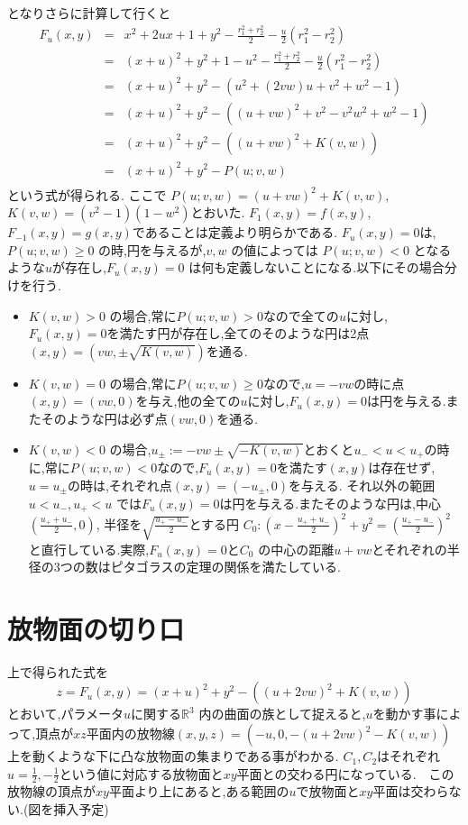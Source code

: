 \documentclass[a4j,12pt]{jarticle}
\numberwithin{equation}{section}
\newcommand{\R}{\mathbb R}
\begin{document}
となりさらに計算して行くと
\begin{eqnarray}
     F_u(x,y) &=& x^2 + 2u x + 1 + y^2  - \frac{r_1^2  +r_2^2}{2} -\frac{u}{2}(r_1^2  -r_2^2) \nonumber\\
      &=&  (x + u )^2  + y^2  +1 - u^2 - \frac{r_1^2  +r_2^2}{2} -\frac{u}{2}(r_1^2  -r_2^2) \nonumber\\
      &=&  (x + u )^2  + y^2  - (u^2 +(2vw)u  + v^2 + w^2  -1) \nonumber\\
      &=&  (x + u )^2  + y^2  - ((u + vw)^2  + v^2 - v^2w^2 + w^2  -1)\nonumber\\
      &=&  (x + u )^2  + y^2  - ((u + vw)^2  + K(v,w))\nonumber\\
      &=&  (x + u )^2  + y^2  - P(u;v,w)\nonumber\\
\end{eqnarray}
という式が得られる. ここで $P(u;v,w) = (u + vw)^2  + K(v,w)$, $K(v,w) = (v^2 - 1)(1 - w^2) $とおいた. $F_{1}(x,y)=f(x,y)$,$F_{-1}(x,y)=g(x,y)$であることは定義より明らかである. $F_u(x,y)=0$は, $P(u;v,w) \ge 0$ の時,円を与えるが,$v,w$ の値によっては $P(u;v,w)<0$ となるような$u$が存在し,$F_u(x,y)=0$ は何も定義しないことになる.以下にその場合分けを行う.
\begin{itemize}
  \item $K(v,w) > 0$ の場合,常に$P(u;v,w) >0$なので全ての$u$に対し,$F_u(x,y)=0$を満たす円が存在し,全てのそのような円は2点$(x,y)=(vw,\pm\sqrt{K(v,w)})$を通る.
  \item $K(v,w) = 0$ の場合,常に$P(u;v,w) \ge 0$なので,$u = -vw$の時に点$(x,y)=(vw,0)$を与え,他の全ての$u$に対し,$F_u(x,y)=0$は円を与える.またそのような円は必ず点$(vw,0)$を通る.
  \item $K(v,w) < 0$ の場合,$u_{\pm}:=-vw\pm\sqrt{-K(v,w)}$とおくと$u_- < u < u_+$の時に,常に$P(u;v,w) < 0$なので,$F_u(x,y)=0$を満たす$(x,y)$は存在せず,$u = u_\pm$の時は,それぞれ点$(x,y)=(-u_\pm,0)$を与える. それ以外の範囲$u < u_-, u_+<u$ では$F_u(x,y)=0$は円を与える.またそのような円は,中心$(\frac{u_++u_-}{2},0)$, 半径を$\sqrt{\frac{u_+-u_-}{2}}$とする円 $C_0: (x-\frac{u_++u_-}{2})^2+y^2=\left(\frac{u_+ - u_-}{2}\right)^2$と直行している.実際,$F_u(x,y)=0$と$C_0$ の中心の距離$u+vw$とそれぞれの半径の3つの数はピタゴラスの定理の関係を満たしている.
\end{itemize}
\section{放物面の切り口}
上で得られた式を
\begin{equation}
\label{}
z = F_u(x,y) = (x + u )^2  + y^2  - ((u + 2vw)^2  + K(v,w))
\end{equation}
とおいて,パラメータ$u$に関する$\R^3$ 内の曲面の族として捉えると,$u$を動かす事によって,頂点が$xz$平面内の放物線$(x,y,z) = (-u, 0, -(u + 2vw)^2  - K(v,w))$上を動くような下に凸な放物面の集まりである事がわかる. $C_1,C_2$はそれぞれ$u=\frac{1}{2},-\frac{1}{2}$という値に対応する放物面と$xy$平面との交わる円になっている.　この放物線の頂点が$xy$平面より上にあると,ある範囲の$u$で放物面と$xy$平面は交わらない.(図を挿入予定)
\end{document}
